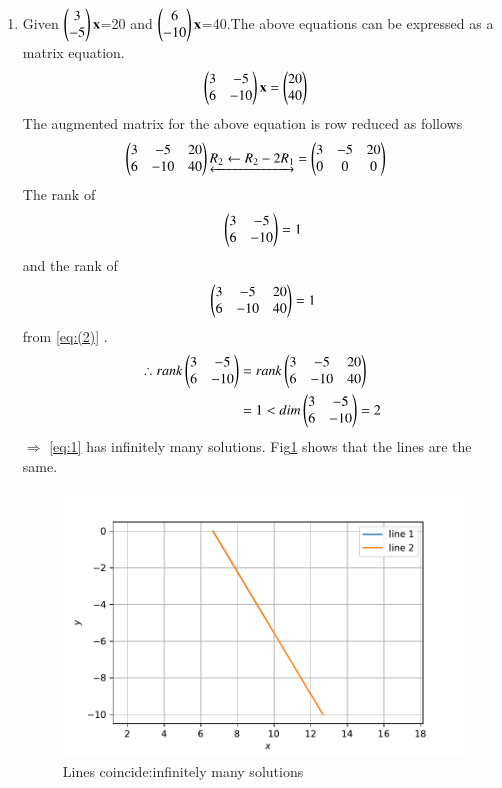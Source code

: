 \documentclass[journal,12pt,twocolumn]{IEEEtran}
\begin{document}
\begin{enumerate}
    \item Given $\begin{pmatrix}3\\-5\end{pmatrix}\mathbf{x}$=20 and $\begin{pmatrix}6\\-10\end{pmatrix}\mathbf{x}$=40.The above equations can be expressed as a matrix equation.
    \begin{align}
\label{eq:1}
  \begin{pmatrix}3&-5\\6&-10\end{pmatrix}\mathbf{x} &= \begin{pmatrix}20\\40\end{pmatrix}
\end{align}
The augmented matrix for the above equation
is row reduced as follows
\begin{align}
    \begin{pmatrix}3&-5&20\\6&-10&40\end{pmatrix}\underleftrightarrow{R_2\leftarrow R_2 -2R_1}&=\begin{pmatrix}3&-5&20\\0&0&0\end{pmatrix} \label{eq:(2)}
\end{align}
The rank of\begin{equation} 
\begin{pmatrix}3&-5\\6&-10\end{pmatrix} = 1
\end{equation} and the rank of
\begin{equation} 
\begin{pmatrix}3&-5&20\\6&-10&40\end{pmatrix} = 1
\end{equation}from \ref{eq:(2)} .
\begin{align}
    \therefore rank \begin{pmatrix}3&-5\\6&-10\end{pmatrix} &= rank\begin{pmatrix}3&-5&20\\6&-10&40\end{pmatrix}\\
    &=1 < dim\begin{pmatrix}3&-5\\6&-10\end{pmatrix}=2
\end{align}
$\Longrightarrow$ \ref{eq:1} has infinitely many solutions.
Fig\ref{fig:1} shows that the lines are the same.
\begin{figure}[ht] 
    \includegraphics[width= \columnwidth]{assignment2c.pdf}
    \caption{Lines coincide:infinitely many solutions}
    \label{fig:1}
\end{figure}



\end{enumerate}
\end{document}
